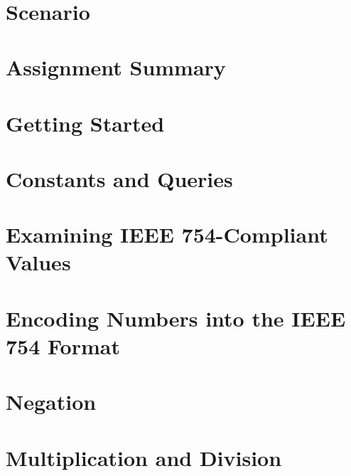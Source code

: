 \documentclass[12pt]{article}
\begin{document}
    \labidentifier\


    \softwareengineeringfrontmatter

    \section*{Scenario}                                                 \scenariointroduction

    \section{Assignment Summary}                                        

    \section{Getting Started}                                           

    \section{Constants and Queries} \label{sec:constantsAndQueries}     

    \section{Examining IEEE 754-Compliant Values}                       

    \section{Encoding Numbers into the IEEE 754 Format}                 

    \section{Negation}                                                  

    \section{Multiplication and Division}                               
\end{document}
